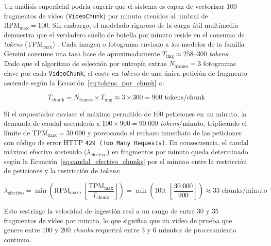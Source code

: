 Un análisis superficial podría sugerir que el sistema es capaz de vectorizar $100$ fragmentos de vídeo (\texttt{VideoChunk}) por minuto atenidos al umbral de $\text{RPM}_{\max} = 100$. %
Sin embargo, el modelado riguroso de la carga útil multimedia demuestra que el verdadero cuello de botella por minuto reside en el consumo de \textit{tokens} ($\text{TPM}_{\max}$) \cite{gemini_emb2_docs}. %
Cada imagen o fotograma enviado a los modelos de la familia Gemini consume una tasa base de aproximadamente $T_{\text{img}} \approx 258\text{--}300$ \textit{tokens} \cite{gemini_emb2_docs}. %
Dado que el algoritmo de selección por entropía extrae $N_{\text{frames}} = 3$ fotogramas clave por cada \texttt{VideoChunk}, el coste en \textit{tokens} de una única petición de fragmento asciende según la Ecuación~\eqref{eq:tokens_por_chunk} a: %

\begin{equation}
T_{\text{chunk}} = N_{\text{frames}} \times T_{\text{img}} \approx 3 \times 300 = 900 \text{ tokens/chunk}
\label{eq:tokens_por_chunk}
\end{equation} %

Si el orquestador enviase el máximo permitido de $100$ peticiones en un minuto, la demanda de caudal ascendería a $100 \times 900 = 90.000$ \textit{tokens}/minuto, triplicando el límite de $\text{TPM}_{\max} = 30.000$ y provocando el rechazo inmediato de las peticiones con código de error HTTP \texttt{429 (Too Many Requests)}. %
En consecuencia, el caudal máximo efectivo sostenido ($\lambda_{\text{efectivo}}$) en fragmentos por minuto queda determinado según la Ecuación~\eqref{eq:caudal_efectivo_chunks} por el mínimo entre la restricción de peticiones y la restricción de \textit{tokens}: %

\begin{equation}
\lambda_{\text{efectivo}} = \min\!\left(\text{RPM}_{\max}, \, \left\lfloor \frac{\text{TPM}_{\max}}{T_{\text{chunk}}} \right\rfloor\right) = \min\!\left(100, \, \left\lfloor \frac{30.000}{900} \right\rfloor\right) \approx 33 \text{ chunks/minuto}
\label{eq:caudal_efectivo_chunks}
\end{equation} %

Esto restringe la velocidad de ingestión real a un rango de entre $30$ y $35$ fragmentos de vídeo por minuto, lo que significa que un vídeo de prueba que genere entre $100$ y $200$ \textit{chunks} requerirá entre $3$ y $6$ minutos de procesamiento continuo. %

